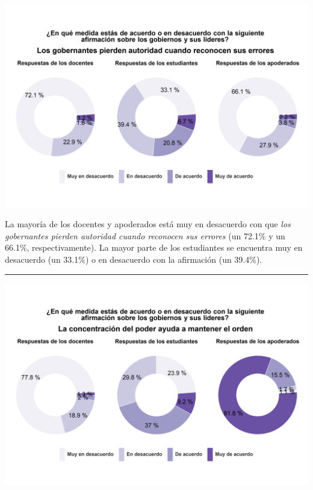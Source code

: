 \documentclass[
  14pt,
]{book}
\let\origfigure\figure
\let\endorigfigure\endfigure
\renewenvironment{figure}[1][2] {
  \expandafter\origfigure\expandafter[H]
} {
  \endorigfigure
}
\begin{document}
\begin{figure}[!ht]

{\centering \includegraphics[width=0.8\linewidth,]{images/graph_aut6} 

}

\caption{Los gobernantes pierden autoridad cuando reconocen sus errores}\label{fig:unnamed-chunk-47}
\end{figure}

La mayoría de los docentes y apoderados está muy en desacuerdo con que \emph{los gobernantes pierden autoridad cuando reconocen sus errores} (un 72.1\% y un 66.1\%, respectivamente). La mayor parte de los estudiantes se encuentra muy en desacuerdo (un 33.1\%) o en desacuerdo con la afirmación (un 39.4\%).

\begin{center}\rule{0.5\linewidth}{0.5pt}\end{center}

\begin{figure}[!ht]

{\centering \includegraphics[width=0.8\linewidth,]{images/graph_aut7} 

}

\caption{Concentrar el poder ayuda a mantener el orden}\label{fig:unnamed-chunk-48}
\end{figure}
\end{document}
